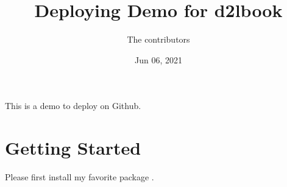 \documentclass[letterpaper,11pt,english]{sphinxmanual}
\title{Deploying Demo for d2lbook}
\date{Jun 06, 2021}
\author{The contributors}
\begin{document}
\pagestyle{empty}
\sphinxmaketitle
\pagestyle{plain}
\sphinxtableofcontents
\pagestyle{normal}
\label{\detokenize{index::doc}}


\sphinxAtStartPar
This is a demo to deploy on Github.


\chapter{Getting Started}
\label{\detokenize{get_started:getting-started}}\label{\detokenize{get_started::doc}}
\sphinxAtStartPar
Please first install my favorite package .



\renewcommand{\indexname}{Index}
\printindex
\end{document}
